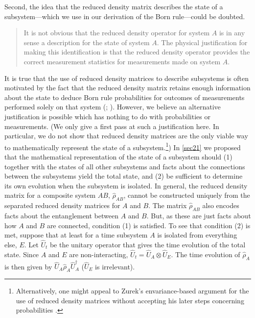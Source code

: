 \documentclass[12pt,onecolumn,secnumarabic,amsmath,amssymb,balancelastpage,nofootinbib]{article}
\begin{document}
Second, the idea that the reduced density matrix describes the state of a subsystem---which we use in our derivation of the Born rule---could be doubted.
\begin{quotation}
\noindent\small{{It is not obvious that the reduced density operator for system $A$ is in any sense a description for the state of system $A$. The physical justification for making this identification is that the reduced density operator provides the correct measurement statistics for measurements made on system $A$.  \citep[.3]{nielsen2010}}}
\end{quotation}
It is true that the use of reduced density matrices to describe subsystems is often motivated by the fact that the reduced density matrix retains enough information about the state to deduce Born rule probabilities for outcomes of measurements performed solely on that system (\citealp[.6]{schlosshauer}; \citealp[box 2.6]{nielsen2010}).  However, we believe an alternative justification is possible which has nothing to do with probabilities or measurements.  (We only give a first pass at such a justification here.  In particular, we do not show that reduced density matrices are the only viable  way to mathematically represent the state of a subsystem.\footnote{Alternatively, one might appeal to Zurek's envariance-based argument for the use of reduced density matrices without accepting his later steps concerning probabilities \citep[II.B]{zurek2005}.})  In \textsection \ref{sec21} we proposed that the mathematical representation of the state of a subsystem should (1) together with the states of all other subsystems and facts about the connections between the subsystems yield the total state, and (2) be sufficient to determine its own evolution when the subsystem is isolated.  In general, the reduced density matrix for a composite system $AB$, $\widehat{\rho}_{AB}$, cannot be constructed uniquely from the separated reduced density matrices for $A$ and $B$.  The matrix $\widehat{\rho}_{AB}$ also encodes facts about the entanglement between $A$ and $B$.  But, as these are just facts about how $A$ and $B$ are connected, condition (1) is satisfied.  To see that condition (2) is met, suppose that at least for a time subsystem $A$ is isolated from everything else, $E$.  Let $\widehat{U}_t$ be the unitary operator that gives the time evolution of the total state.  Since $A$ and $E$ are non-interacting, $\widehat{U}_t=\widehat{U}_A\otimes\widehat{U}_E$.  The time evolution of $\widehat{\rho}_A$ is then given by $\widehat{U}_A\widehat{\rho}_A\widehat{U}_A^\dagger$ ($\widehat{U}_E$ is irrelevant).
\end{document}
